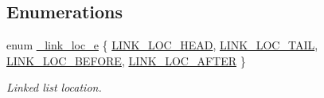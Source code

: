 \subsection*{Enumerations}
\begin{CompactItemize}
\item 
enum \hyperlink{group__dbprim__link_ga28}{\_\-link\_\-loc\_\-e} \{ \hyperlink{group__dbprim__link_gga28a133}{LINK\_\-LOC\_\-HEAD}, 
\hyperlink{group__dbprim__link_gga28a134}{LINK\_\-LOC\_\-TAIL}, 
\hyperlink{group__dbprim__link_gga28a135}{LINK\_\-LOC\_\-BEFORE}, 
\hyperlink{group__dbprim__link_gga28a136}{LINK\_\-LOC\_\-AFTER}
 \}
\begin{CompactList}\small\item\em Linked list location. \item\end{CompactList}\end{CompactItemize}
